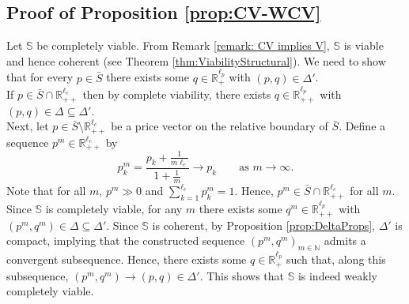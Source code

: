 \documentclass[11pt,fleqn]{article}
\begin{document}
\subsection{Proof of Proposition \ref{prop:CV-WCV}}\label{sec: appB1}

Let $\mathbb S$ be completely viable. From Remark \ref{remark: CV implies V}, $\mathbb{S}$ is viable and hence coherent (see Theorem \ref{thm:ViabilityStructural}). We need to show that for every $p \in \bar S$ there exists some $q \in \mathbb R^{\ell_p}_+$ with $(p,q) \in \Delta'$. \\
	If $p \in \bar S \cap \mathbb R^{\ell_c}_{++}$ then by complete viability, there exists $q \in \mathbb R^{\ell_p}_{++}$ with $(p,q) \in \Delta \subseteq \Delta'$. \\
	Next, let $p \in \bar S \setminus \mathbb R^{\ell_c}_{++}$ be a price vector on the relative boundary of $\bar S$. Define a sequence $p^m \in \mathbb R^{\ell_c}_{++}$ by
	\[
	p^m_k = \frac{p_k + \tfrac{1}{m \ell_c}}{1+ \tfrac{1}{m}} \to p_k \qquad \mbox{as } m \to \infty .
	\]
	Note that for all $m$, $p^m \gg 0$ and $\sum^{\ell_c}_{k=1} p^m_k =1$. Hence, $p^m \in \bar S \cap \mathbb R^{\ell_c}_{++}$ for all $m$. \\
	Since $\mathbb S$ is completely viable, for any $m$ there exists some $q^m \in \mathbb R^{\ell_p}_{++}$ with $\left( p^m,q^m \right) \in \Delta\subseteq \Delta'$. Since $\mathbb S$ is coherent, by Proposition \ref{prop:DeltaProps}, $\Delta'$ is compact, implying that the constructed sequence $\left( p^m,q^m \right)_{m \in \mathbb N}$ admits a convergent subsequence. Hence, there exists some $q \in \mathbb R^{\ell_p}_+$ such that, along this subsequence, $\left( p^m,q^m \right) \to (p,q) \in \Delta'$. This shows that $\mathbb S$ is indeed weakly completely viable.
\end{document}
